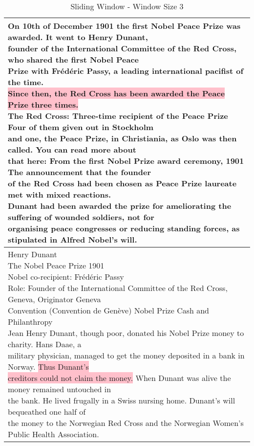 \begin{appendices}
\begin{table}[h!]
{\begin{tabular}{l}
                \shortstack[l]{
                    On 10th of December 1901 the first Nobel Peace Prize was awarded. It went to Henry Dunant, \\
                    founder of the International Committee of the Red Cross, who shared the first Nobel Peace \\
                    Prize with Frédéric Passy, a leading international pacifist of the time. \\
                    \colorbox{pink}{Since then, the Red Cross has been awarded the Peace Prize three times.} \\
                    The Red Cross: Three-time recipient of the Peace Prize Four of them given out in Stockholm  \\
                    and one, the Peace Prize, in Christiania, as Oslo was then called. You can read more about \\
                    that here: From the first Nobel Prize award ceremony, 1901 The announcement that the founder\\
                    of the Red Cross had been chosen as Peace Prize laureate met with mixed reactions.\\
                    Dunant had been awarded the prize for ameliorating the suffering of wounded soldiers, not for \\
                    organising peace congresses or reducing standing forces, as stipulated in Alfred Nobel’s will.
                } \\ \hline
                \shortstack[l]{
                    Henry Dunant \\
                    The Nobel Peace Prize 1901 \\
                    Nobel co-recipient: Frédéric Passy \\
                    Role: Founder of the International Committee of the Red Cross, Geneva, Originator Geneva \\
                    Convention (Convention de Genève) Nobel Prize Cash and Philanthropy \\
                    Jean Henry Dunant, though poor, donated his Nobel Prize money to charity. Hans Daae, a \\
                    military physician, managed to get the money deposited in a bank in Norway. \colorbox{pink}{Thus Dunant’s}\\
                    \colorbox{pink}{creditors could not claim the money.} When Dunant was alive the money remained untouched in \\
                    the bank. He lived frugally in a Swiss nursing home. Dunant’s will bequeathed one half of \\
                    the money to the Norwegian Red Cross and the Norwegian Women’s Public Health Association.
                } \\
                \bottomrule
            \end{tabular}}\caption{Sliding Window - Window Size 3}\label{tab:table-sliding-window}
        \label{tab:table}
    \end{table}


\end{appendices}